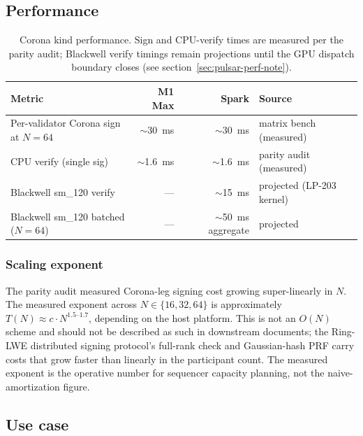\subsection{Performance}

\begin{table}[h]
\centering
\small
\begin{tabular}{@{}lrrl@{}}
\toprule
\textbf{Metric} & \textbf{M1 Max} & \textbf{Spark} & \textbf{Source} \\
\midrule
Per-validator Corona sign at $N{=}64$ & $\sim$\SI{30}{\milli\second} & $\sim$\SI{30}{\milli\second} & matrix bench (measured)~\cite{parityaudit} \\
CPU verify (single sig) & $\sim$\SI{1.6}{\milli\second} & $\sim$\SI{1.6}{\milli\second} & parity audit (measured) \\
Blackwell sm\_120 verify & --- & $\sim$\SI{15}{\milli\second} & projected (LP-203 kernel)~\cite{lp203} \\
Blackwell sm\_120 batched ($N{=}64$) & --- & $\sim$\SI{50}{\milli\second} aggregate & projected \\
\bottomrule
\end{tabular}
\caption{Corona kind performance. Sign and CPU-verify times are
measured per the parity audit; Blackwell verify timings remain
projections until the GPU dispatch boundary closes (see
section~\ref{sec:pulsar-perf-note}).}
\label{tab:corona-perf}
\end{table}

\subsubsection{Scaling exponent}

The parity audit measured Corona-leg signing cost growing
super-linearly in $N$. The measured exponent across
$N \in \{16, 32, 64\}$ is approximately
$T(N) \approx c \cdot N^{1.5\text{--}1.7}$, depending on the
host platform. This is not an $O(N)$ scheme and should not be
described as such in downstream documents; the Ring-LWE
distributed signing protocol's full-rank check and
Gaussian-hash PRF carry costs that grow faster than linearly in
the participant count. The measured exponent is the operative
number for sequencer capacity planning, not the
naive-amortization figure.

\subsection{Use case}

